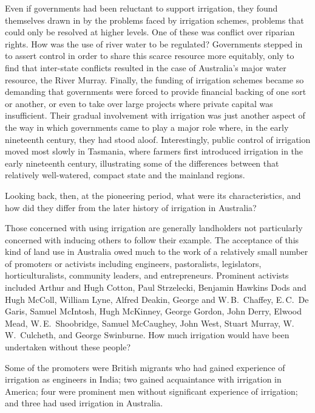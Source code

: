 Even if governments had been reluctant to support irrigation, they
found themselves drawn in by the problems faced by irrigation schemes,
problems that could only be resolved at higher levels. One of these
was conflict over riparian rights.  How was the
use of river water to be regulated? Governments stepped in to assert
control in order to share this scarce resource more equitably, only to
find that inter-state conflicts resulted in the case of Australia's
major water resource, the River Murray. Finally, the funding of
irrigation schemes became so demanding that governments were forced to
provide financial backing of one sort or another, or even to take over
large projects where private capital was insufficient. Their gradual
involvement with irrigation was just another aspect of the way in
which governments came to play a major role where, in the early
nineteenth century, they had stood aloof. Interestingly, public
control of irrigation moved most slowly in Tasmania, 
where farmers first introduced irrigation in the early nineteenth
century, illustrating some of the differences between that relatively
well-watered, compact state and the mainland regions.

Looking back, then, at the pioneering period, what were its
characteristics, and how did they differ from the later history of
irrigation in Australia?

\bigskip\noindent
Those concerned with using irrigation are generally landholders not
particularly concerned with inducing others to follow their
example. The acceptance of this kind of land use in Australia owed
much to the work of a relatively small number of promoters or
activists including engineers, pastoralists, legislators,
horticulturalists, community leaders, and entrepreneurs.  Prominent
activists included Arthur and Hugh Cotton, Paul Strzelecki, Benjamin
Hawkins Dods and Hugh McColl, William Lyne, Alfred Deakin, George and
W.\,B.~Chaffey, E.\,C.~De Garis, Samuel McIntosh, Hugh McKinney,
George Gordon, John Derry, Elwood Mead, W.\,E.~Shoobridge, Samuel
McCaughey, John West, Stuart Murray, W.\,W.~Culcheth, and George
Swinburne. How much irrigation would have been undertaken without
these people?

Some of the promoters were British migrants who had gained experience
of irrigation as engineers in India; two gained acquaintance with
irrigation in America; four were prominent men without significant
experience of irrigation; and three had used irrigation in Australia.


